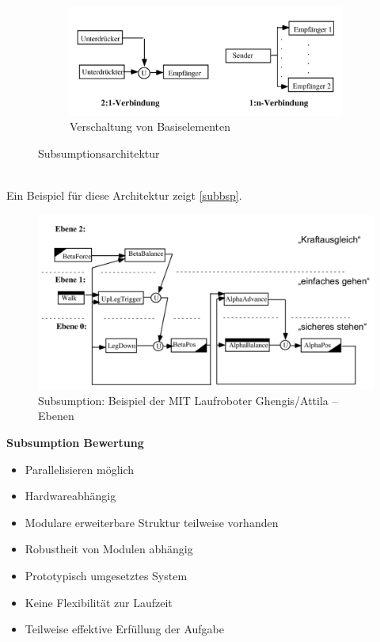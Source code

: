 \begin{figure}[h!]
\begin{subfigure}{.5\textwidth}
	\end{subfigure}
	\begin{subfigure}{.5\textwidth}
		\centering
		\includegraphics[width=\textwidth]{figures/verschaltung_basiselement.png}
		\caption{Verschaltung von Basiselementen}
	\end{subfigure}
	\caption{Subsumptionsarchitektur}
	\label{subsum}
\end{figure}\\
Ein Beispiel für diese Architektur zeigt \autoref{subbsp}.
\begin{figure}[h!]
	\includegraphics[width=.8\textwidth]{figures/subsumption_beispiel.png}
	\caption{Subsumption: Beispiel der MIT Laufroboter Ghengis/Attila -- Ebenen}
	\label{subbsp}
\end{figure}

\textbf{Subsumption Bewertung}
\begin{itemize}
	\item Parallelisieren möglich
	\item Hardwareabhängig
	\item Modulare erweiterbare Struktur teilweise vorhanden
	\item Robustheit von Modulen abhängig
	\item Prototypisch umgesetztes System
	\item Keine Flexibilität zur Laufzeit
	\item Teilweise effektive Erfüllung der Aufgabe
\end{itemize}

